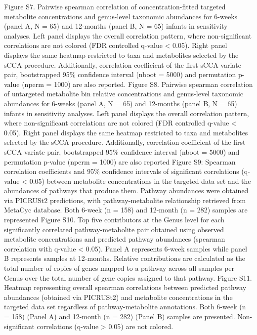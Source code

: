 Figure S7. Pairwise spearman correlation of concentration-fitted targeted metabolite concentrations and genus-level taxonomic abundances for 6-weeks (panel A, N = 65) and 12-months (panel B, N = 65) infants in sensitivity analyses. Left panel displays the overall correlation pattern, where non-significant correlations are not colored (FDR controlled q-value < 0.05). Right panel displays the same heatmap restricted to taxa and metabolites selected by the sCCA procedure. Additionally, correlation coefficient of the first sCCA variate pair, bootstrapped 95\% confidence interval (nboot = 5000) and permutation p-value (nperm = 1000) are also reported.
Figure S8. Pairwise spearman correlation of untargeted metabolite bin relative concentrations and genus-level taxonomic abundances for 6-weeks (panel A, N = 65) and 12-months (panel B, N = 65) infants in sensitivity analyses. Left panel displays the overall correlation pattern, where non-significant correlations are not colored (FDR controlled q-value < 0.05). Right panel displays the same heatmap restricted to taxa and metabolites selected by the sCCA procedure. Additionally, correlation coefficient of the first sCCA variate pair, bootstrapped 95\% confidence interval (nboot = 5000) and permutation p-value (nperm = 1000) are also reported
Figure S9: Spearman correlation coefficients and 95\% confidence intervals of significant correlations (q-value < 0.05) between metabolite concentrations in the targeted data set and the abundances of pathways that produce them. Pathway abundances were obtained via PICRUSt2 predictions, with pathway-metabolite relationship retrieved from MetaCyc database. Both 6-week (n = 158) and 12-month (n = 282) samples are represented
Figure S10. Top five contributors at the Genus level for each significantly correlated pathway-metabolite pair obtained using observed metabolite concentrations and predicted pathway abundances (spearman correlation with q-value < 0.05). Panel A represents 6-week samples while panel B represents samples at 12-months. Relative contributions are calculated as the total number of copies of genes mapped to a pathway across all samples per Genus over the total number of gene copies assigned to that pathway. 
Figure S11. Heatmap representing overall spearman correlations between predicted pathway abundances (obtained via PICRUSt2) and metabolite concentrations in the targeted data set regardless of pathway-metabolite annotations. Both 6-week (n = 158) (Panel A) and 12-month (n = 282) (Panel B) samples are presented. Non-significant correlations (q-value > 0.05) are not colored. 
